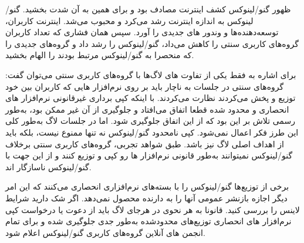 ظهور گنو/لینوکس کشف اینترنت مصادف بود و برای همین به آن شدت بخشید.
گنو/لینوکس به اندازه اینترنت رشد می‌کرد و محبوب می‌شد.
اینترنت کاربران، توسعه‌دهنده‌ها و وندور های جدیدی را آورد.
سپس همان فشاری که تعداد کاربران گروه‌های کاربری سنتی را کاهش می‌داد،
گنو/لینوکس را رشد داد و گروه‌های جدیدی را که منحصرا به گنو/لینوکس مرتبط بودند
را الهام بخشید.

برای اشاره به فقط یکی از تفاوت های لاگ‌ها با گروه‌های کاربری سنتی می‌توان گفت:
گروه‌های سنتی در جلسات به ناچار باید بر روی نرم‌افزار هایی که کاربران بین خود
توزیع و پخش می‌کردند نظارت می‌کردند. با اینکه کپی برداری غیرقانونی نرم‌افزار های
انحصاری و محدود شده قطعا اتفاق می‌افتاد و جلوگیری از آن غیر ممکن بود، به‌طور رسمی
تلاش بر این بود که از این اتفاق جلوگیری شود.
اما در جلسات لاگ به‌طور کلی این طرز فکر اعمال نمی‌شود. کپی نامحدود گنو/لینوکس نه تنها ممنوع نیست،
بلکه باید از اهداف اصلی لاگ نیز باشد. طبق شواهد تجربی، گروه‌های کاربری سنتی برخلاف گنو/لینوکس
نمیتوانند به‌طور قانونی نرم‌افزار ها رو کپی و توزیع کنند و از این جهت با گنو/لینوکس ناسازگار اند.


\begin{caveat}
برخی از توزیع‌ها گنو/لینوکس را با بسته‌های نرم‌افزاری انحصاری
می‌کنند که این امر
دیگر اجازه بازنشر عمومی آنها را به دارنده محصول نمی‌دهد. اگر شک دارید شرایط لاینس را بررسی کنید.
قانونا به هر نحوی در هرجای لاگ باید از دعوت یا درخواست کپی نرم‌افزار های انحصاری توزیع‌های محدودشده
 به‌طور جدی جلوگیری شده و برای تمام انجمن های آنلاین گروه‌های کاربری گنو/لینوکس
اعلام شود.
\end{caveat}




